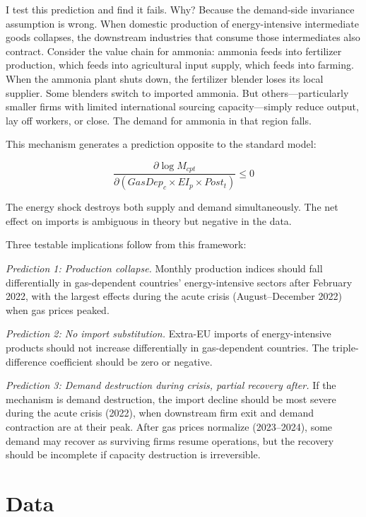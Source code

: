 \documentclass[12pt]{article}
\begin{document}
I test this prediction and find it fails. Why? Because the demand-side invariance assumption is wrong. When domestic production of energy-intensive intermediate goods collapses, the downstream industries that consume those intermediates also contract. Consider the value chain for ammonia: ammonia feeds into fertilizer production, which feeds into agricultural input supply, which feeds into farming. When the ammonia plant shuts down, the fertilizer blender loses its local supplier. Some blenders switch to imported ammonia. But others---particularly smaller firms with limited international sourcing capacity---simply reduce output, lay off workers, or close. The demand for ammonia in that region falls.

This mechanism generates a prediction opposite to the standard model:

\begin{equation}
\frac{\partial \log M_{cpt}}{\partial (GasDep_c \times EI_p \times Post_t)} \leq 0
\label{eq:prediction_demand}
\end{equation}

The energy shock destroys both supply and demand simultaneously. The net effect on imports is ambiguous in theory but negative in the data.

Three testable implications follow from this framework:

\textit{Prediction 1: Production collapse.} Monthly production indices should fall differentially in gas-dependent countries' energy-intensive sectors after February 2022, with the largest effects during the acute crisis (August--December 2022) when gas prices peaked.

\textit{Prediction 2: No import substitution.} Extra-EU imports of energy-intensive products should not increase differentially in gas-dependent countries. The triple-difference coefficient should be zero or negative.

\textit{Prediction 3: Demand destruction during crisis, partial recovery after.} If the mechanism is demand destruction, the import decline should be most severe during the acute crisis (2022), when downstream firm exit and demand contraction are at their peak. After gas prices normalize (2023--2024), some demand may recover as surviving firms resume operations, but the recovery should be incomplete if capacity destruction is irreversible.


\section{Data}
\label{sec:data}
\end{document}
